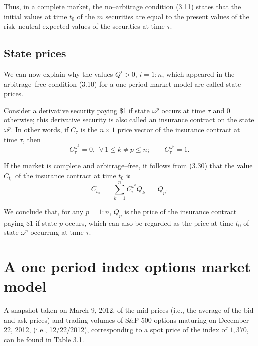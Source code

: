 Thus, in a complete market, the no--arbitrage condition (3.11) states that
the initial values at time $t_0$ of the $m$ securities are equal to the
present values of the risk--neutral expected values of the securities at
time $\tau$.

\subsection{State prices}

We can now explain why the values $Q^i > 0$, $i = 1:n$, which appeared in
the arbitrage--free condition (3.10) for a one period market model are
called state prices.

Consider a derivative security paying \$1 if state $\omega^p$ occurs at
time $\tau$ and 0 otherwise; this derivative security is also called an
insurance contract on the state $\omega^p$. In other words, if $C_\tau$
is the $n \times 1$ price vector of the insurance contract at time
$\tau$, then
\[
C_\tau^{\omega^k} = 0, \ \ \forall\, 1 \le k \neq p \le n; \qquad C_\tau^{\omega^p} = 1.
\]

If the market is complete and arbitrage--free, it follows from (3.30)
that the value $C_{t_0}$ of the insurance contract at time $t_0$ is
\[
C_{t_0} \ = \ \sum_{k=1}^n C_\tau^{\omega^k} Q_k \ = \ Q_p.
\]

We conclude that, for any $p = 1:n$, $Q_p$ is the price of the insurance
contract paying \$1 if state $p$ occurs, which can also be regarded as
the price at time $t_0$ of state $\omega^p$ occurring at time $\tau$.

\section{A one period index options market model}

A snapshot taken on March 9, 2012, of the mid prices (i.e., the average
of the bid and ask prices) and trading volumes of S\&P 500 options
maturing on December 22, 2012, (i.e., 12/22/2012), corresponding to a
spot price of the index of $1,370$, can be found in Table 3.1.

